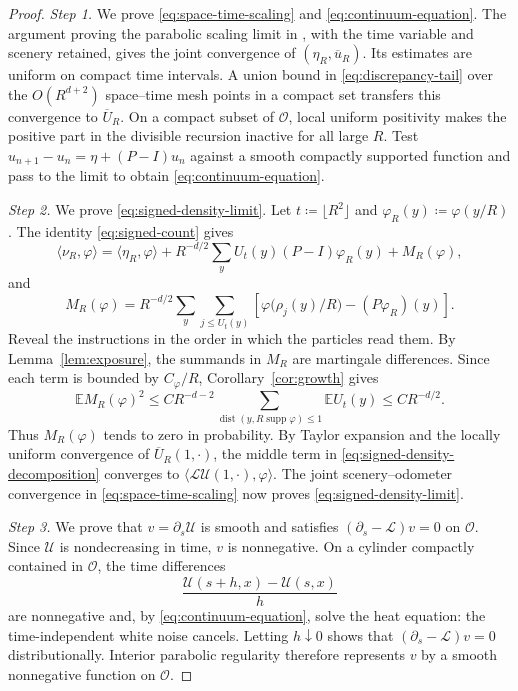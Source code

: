 \documentclass[11pt]{amsart}
\theoremstyle{plain}
\theoremstyle{definition}
\newcommand{\E}{\mathbb{E}}
\begin{document}
\begin{proof}
	\smallskip
	\noindent\emph{Step 1.} We prove \eqref{eq:space-time-scaling} and
	\eqref{eq:continuum-equation}.
	The argument proving the parabolic scaling limit in \citet{BP}, with the
	time variable and scenery retained, gives the joint convergence of
	$(\eta_R,\overline u_R)$. Its estimates are uniform on compact time
	intervals. A union bound in \eqref{eq:discrepancy-tail} over the
	$O(R^{d+2})$ space--time mesh points in a compact set transfers this
	convergence to $\overline U_R$. On a compact subset of $\mathcal O$, local
	uniform positivity makes
	the positive part in the divisible recursion inactive for all large $R$.
	Test $u_{n+1}-u_n=\eta+(P-I)u_n$ against a smooth compactly supported
	function and pass to the limit to obtain \eqref{eq:continuum-equation}.

	\smallskip
	\noindent\emph{Step 2.} We prove \eqref{eq:signed-density-limit}.
	Let $t\coloneqq\lfloor R^2\rfloor$ and
	$\varphi_R(y)\coloneqq\varphi(y/R)$. The identity \eqref{eq:signed-count}
	gives
	\begin{equation}\label{eq:signed-density-decomposition}
		\langle\nu_R,\varphi\rangle
		=\langle\eta_R,\varphi\rangle
		+R^{-d/2}\sum_yU_t(y)(P-I)\varphi_R(y)+M_R(\varphi),
	\end{equation}
	and
	\[
		M_R(\varphi)=R^{-d/2}\sum_y\sum_{j\leq U_t(y)}
		\left[\varphi\bigl(\rho_j(y)/R\bigr)-(P\varphi_R)(y)\right].
	\]
	Reveal the instructions in the order in which the particles read them. By Lemma~\ref{lem:exposure}, the summands in $M_R$ are martingale differences. Since each term is bounded by $C_\varphi/R$,
	Corollary~\ref{cor:growth} gives
	\[
		\E M_R(\varphi)^2
		\leq CR^{-d-2}
		\sum_{\operatorname{dist}(y,R\operatorname{supp}\varphi)\leq1}
		\E U_t(y)
		\leq CR^{-d/2}.
	\]
	Thus $M_R(\varphi)$ tends to zero in probability. By Taylor expansion and the
	locally uniform convergence of $\overline U_R(1,\cdot)$, the middle term
	in \eqref{eq:signed-density-decomposition} converges to
	$\langle\mathcal L\mathcal U(1,\cdot),\varphi\rangle$. The joint
	scenery--odometer convergence in \eqref{eq:space-time-scaling} now proves
	\eqref{eq:signed-density-limit}.

	\smallskip
	\noindent\emph{Step 3.} We prove that $v=\partial_s\mathcal U$ is smooth and
	satisfies $(\partial_s-\mathcal L)v=0$ on $\mathcal O$. Since $\mathcal U$ is nondecreasing in time, $v$ is nonnegative. On a cylinder compactly contained in $\mathcal O$, the time differences
	\[
		\frac{\mathcal U(s+h,x)-\mathcal U(s,x)}h
	\]
	are nonnegative and, by \eqref{eq:continuum-equation}, solve the heat equation: the time-independent white noise cancels. Letting $h\downarrow0$ shows that $(\partial_s-\mathcal L)v=0$ distributionally. Interior parabolic regularity therefore represents $v$ by a smooth nonnegative function on $\mathcal O$.


\end{proof}
\end{document}
